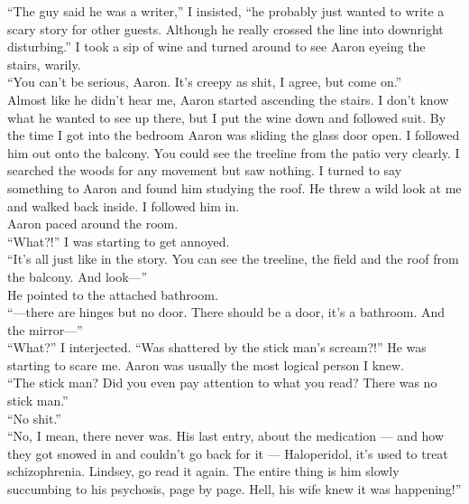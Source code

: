 \documentclass[a5paper]{scrartcl}
\begin{document}
\enquote{The guy said he was a writer,} I insisted, \enquote{he probably just wanted to write a scary story for other guests. Although he really crossed the line into downright disturbing.} I took a sip of wine and turned around to see Aaron eyeing the stairs, warily.\\


\enquote{You can't be serious, Aaron. It's creepy as shit, I agree, but come on.}\\


Almost like he didn't hear me, Aaron started ascending the stairs. I don't know what he wanted to see up there, but I put the wine down and followed suit. By the time I got into the bedroom Aaron was sliding the glass door open. I followed him out onto the balcony. You could see the treeline from the patio very clearly. I searched the woods for any movement but saw nothing. I turned to say something to Aaron and found him studying the roof. He threw a wild look at me and walked back inside. I followed him in.\\


Aaron paced around the room.\\


\enquote{What?!} I was starting to get annoyed.\\


\enquote{It's all just like in the story. You can see the treeline, the field and the roof from the balcony. And look---}\\


He pointed to the attached bathroom.\\


\enquote{---there are hinges but no door. There should be a door, it's a bathroom. And the mirror---} \\


\enquote{What?} I interjected. \enquote{Was shattered by the stick man's scream?!} He was starting to scare me. Aaron was usually the most logical person I knew. \\


\enquote{The stick man? Did you even pay attention to what you read? There was no stick man.}\\


\enquote{No shit.}\\


\enquote{No, I mean, there never was. His last entry, about the medication --- and how they got snowed in and couldn't go back for it --- Haloperidol, it's used to treat schizophrenia. Lindsey, go read it again. The entire thing is him slowly succumbing to his psychosis, page by page. Hell, his wife knew it was happening!}\\
\end{document}
